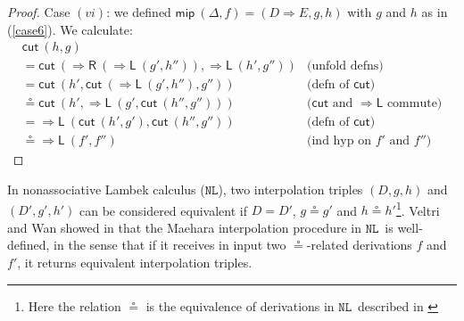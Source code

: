 \documentclass[a4paper,UKenglish,cleveref,autoref,thm-restate, anonymous]{lipics-v2021}
\newcommand{\Rarr}{\Rightarrow}
\newcommand{\mf}[1]{\mathsf{#1}}
\newcommand{\GD}{\Delta}
\newcommand{\GL}{\Lambda}
\newcommand{\NL}{$\mathtt{NL}$}
\newcommand{\Rl}{{\Rarr}\mathsf{L}}
\newcommand{\Rr}{{\Rarr}\mathsf{R}}
\newcommand{\cut}{\mf{cut}}
\begin{document}
\begin{proof}
    Case $(vi)$: we defined $\mf{mip}\ (\GD,f) = (D \Rarr E ,g, h)$ with $g$ and $h$ as in (\ref{case6}). We calculate:
    \[
    \begin{array}{lr}
      \cut\ (h,g) \\
      =
      \cut \ (\Rr \ (\Rl \ (g' , h'')), \Rl \ (h' , g'')) & \text{(unfold defns)}
      \\
      = \cut \ (h' , \cut \ (\Rl \ (g' , h'') , g'')) & \text{(defn of $\cut$)}
      \\
      \circeq \cut \ (h' , \Rl \ (g' , \cut \ (h'' , g''))) & \text{($\cut$ and $\Rl$ commute)}
      \\
      = \Rl \ (\cut \ (h' , g') , \cut \ (h'' , g'')) & \text{(defn of $\cut$)}
      \\
      \circeq \Rl \ (f' , f'') & \text{(ind hyp on $f'$ and $f''$)}
    \end{array}
    \]
\end{proof}
In nonassociative Lambek calculus (\NL), two interpolation triples $(D , g , h)$ and $(D' , g' , h')$ can be considered equivalent if $D = D'$, $g \circeq g'$ and $h \circeq h'$\footnote{Here the relation $\circeq$ is the equivalence of derivations in \NL\ described in \cite{VW2025Tableaux}}. Veltri and Wan showed in \cite{VW2025Tableaux} that the Maehara interpolation procedure in \NL\ is well-defined, in the sense that if it receives in input two $\circeq$-related derivations $f$ and $f'$, it returns equivalent interpolation triples.
\end{document}
